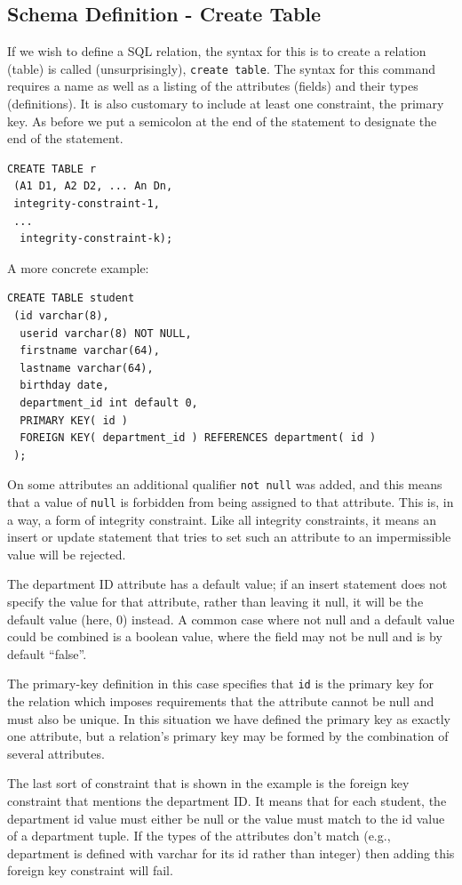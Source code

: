 \subsection*{Schema Definition - Create Table} 
If we wish to define a SQL relation, the syntax for this is to create a relation (table) is called (unsurprisingly), \texttt{create table}. The syntax for this command requires a name as well as a listing of the attributes (fields) and their types (definitions). It is also customary to include at least one constraint, the primary key. As before we put a semicolon at the end of the statement to designate the end of the statement. 


\begin{verbatim}
CREATE TABLE r
 (A1 D1, A2 D2, ... An Dn,
 integrity-constraint-1,
 ...
  integrity-constraint-k);
\end{verbatim}

A more concrete example: 

\begin{verbatim}
CREATE TABLE student
 (id varchar(8),
  userid varchar(8) NOT NULL,
  firstname varchar(64),
  lastname varchar(64),
  birthday date,
  department_id int default 0,
  PRIMARY KEY( id )
  FOREIGN KEY( department_id ) REFERENCES department( id )
 );
\end{verbatim}


On some attributes an additional qualifier \texttt{not null} was added, and this means that a value of \texttt{null} is forbidden from being assigned to that attribute. This is, in a way, a form of integrity constraint. Like all integrity constraints, it means an insert or update statement that tries to set such an attribute to an impermissible value will be rejected. 

The department ID attribute has a default value; if an insert statement does not specify the value for that attribute, rather than leaving it null, it will be the default value (here, 0) instead. A common case where not null and a default value could be combined is a boolean value, where the field may not be null and is by default ``false''.

The primary-key definition in this case specifies that \texttt{id} is the primary key for the relation which imposes requirements that the attribute cannot be null and must also be unique. In this situation we have defined the primary key as exactly one attribute, but a relation's primary key may be formed by the combination of several attributes. 
 
The last sort of constraint that is shown in the example is the foreign key constraint that mentions the department ID. It means that for each student, the department id value must either be null or the value must match to the id value of a department tuple. If the types of the attributes don't match (e.g., department is defined with varchar for its id rather than integer) then adding this foreign key constraint will fail. 


